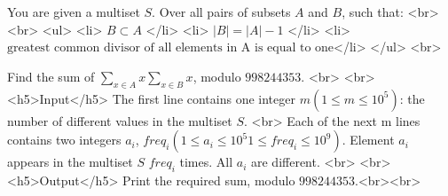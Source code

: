 You are given a multiset $S$. Over all pairs of subsets $A$ and $B$, such that: <br>
<br>
<ul>
<li> $B⊂A$ </li>
<li> $|B|=|A|−1$ </li>
<li> $\text{greatest common divisor of all elements in A is equal to one}$</li>
</ul>
<br>

Find the sum of $\sum_{x \in A} x \sum_{x \in B} x$, modulo $998244353$. <br>
<br>
<h5>Input</h5>
The first line contains one integer $m (1 \leq m \leq 10^5)$: the number of different values in the multiset $S$. <br> 
Each of the next m lines contains two integers $a_i$, $freq_i (1 \leq a_i \leq 10^5 1 \leq freq_i \leq 10^9)$. Element $a_i$ appears in the multiset $S$ $freq_i$ times. All $a_i$ are different.
<br>
<br>
<h5>Output</h5>
Print the required sum, modulo $998244353$.<br><br>